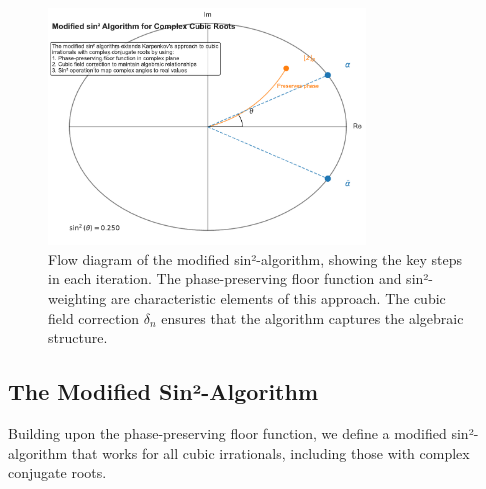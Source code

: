 \begin{figure}[p]
\vspace*{2cm}
\begin{minipage}{\textwidth}
\centering
\includegraphics[width=0.75\textwidth]{figures/output/sin2_algorithm_visualization.pdf}

\vspace{1.5cm}
\caption{Flow diagram of the modified sin²-algorithm, showing the key steps in each iteration. The phase-preserving floor function and sin²-weighting are characteristic elements of this approach. The cubic field correction $\delta_n$ ensures that the algorithm captures the algebraic structure.}
\label{fig:sin2_algorithm}
\end{minipage}
\vspace{2cm}
\end{figure}
\clearpage

\subsection{The Modified Sin²-Algorithm}

Building upon the phase-preserving floor function, we define a modified sin²-algorithm that works for all cubic irrationals, including those with complex conjugate roots.

